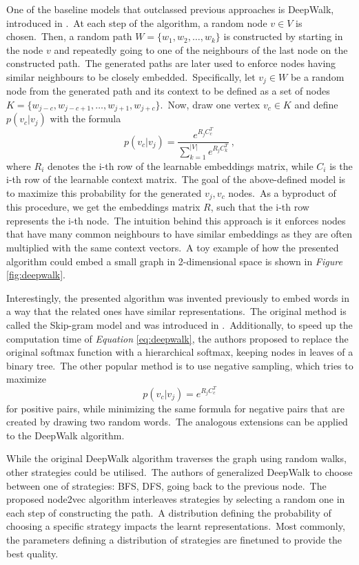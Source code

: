 \documentclass[longabstract, english, mgr]{iithesis}
\theoremstyle{default_theorem_style}\newtheorem{theorem}{Theorem}
\theoremstyle{default_theorem_style}\newtheorem{definition}{Definition}
\begin{document}
One of the baseline models that outclassed previous approaches is DeepWalk, introduced in \cite{deepwalk}.\ At each step
of the algorithm, a random node $v \in V$ is chosen.\ Then, a random path $W = \{w_1, w_2, \dots, w_k\}$ is
constructed by starting in the node $v$ and repeatedly going to one of the neighbours of the last node on the
constructed path.\ The generated paths are later used to enforce nodes having similar neighbours to be closely
embedded.\ Specifically, let $v_j \in W$ be a random node from the generated path and its context to be defined as
a set of nodes $K = \{w_{j - c}, w_{j - c + 1}, \dots, w_{j + 1}, w_{j + c}\}$.\ Now, draw one vertex $v_c \in K$
and define $p(v_c | v_j)$ with the formula
\begin{equation}\label{eq:deepwalk}
p(v_c | v_j) = \frac{e^{R_j C_c^T}}{\sum_{k=1}^{|V|} e^{R_j C_k^T}}\ ,
\end{equation}
where $R_i$ denotes the i-th row of the learnable embeddings matrix, while $C_i$ is the i-th row of the learnable
context matrix.\ The goal of the above-defined model is to maximize this probability for the generated $v_j, v_c$
nodes.\ As a byproduct of this procedure, we get the embeddings matrix $R$, such that the i-th row represents the
i-th node.\ The intuition behind this approach is it enforces nodes that have many common neighbours to have similar
embeddings as they are often multiplied with the same context vectors.\ A toy example of how the presented algorithm
could embed a small graph in 2-dimensional space is shown in \textit{Figure} \ref{fig:deepwalk}.\newline

\noindent Interestingly, the presented algorithm was invented previously to embed words in a way that the related ones
have similar representations.\ The original method is called the Skip-gram model and was introduced in
\cite{skipgram}.\ Additionally, to speed up the computation time of \textit{Equation} \ref{eq:deepwalk}, the authors
proposed to replace the original softmax function with a hierarchical softmax, keeping nodes in leaves of a binary
tree.\ The other popular method is to use negative sampling, which tries to maximize
$$
p(v_c | v_j) = e^{R_j C_c^T}
$$
for positive pairs, while minimizing the same formula for negative pairs that are created by drawing two random
words.\ The analogous extensions can be applied to the DeepWalk algorithm.\newline

\noindent While the original DeepWalk algorithm traverses the graph using random walks, other strategies could
be utilised.\ The authors of \cite{node2vec} generalized DeepWalk to choose between one of strategies: BFS, DFS,
going back to the previous node.\ The proposed node2vec algorithm interleaves strategies by selecting a random one in
each step of constructing the path.\ A distribution defining the probability of choosing a specific strategy impacts the
learnt representations.\ Most commonly, the parameters defining a distribution of strategies are finetuned to provide
the best quality.\newline
\end{document}
